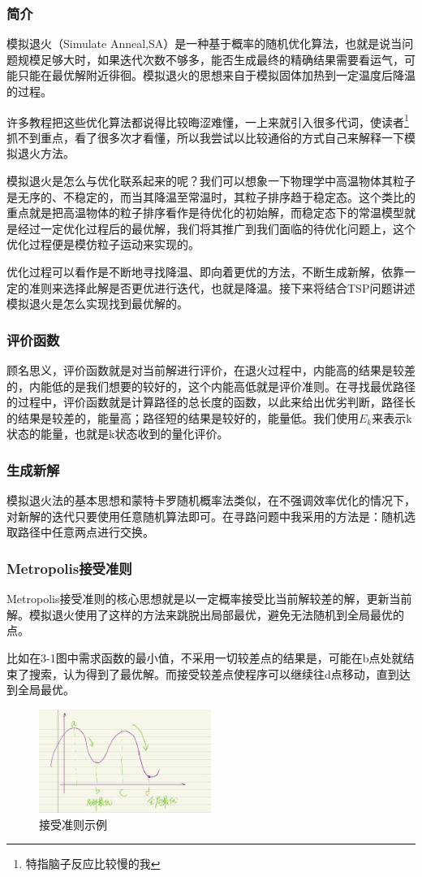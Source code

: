 \documentclass[12pt]{article}
\begin{document}
\subsubsection{简介}
模拟退火（Simulate Anneal,SA）是一种基于概率的随机优化算法，也就是说当问题规模足够大时，如果迭代次数不够多，能否生成最终的精确结果需要看运气，可能只能在最优解附近徘徊。模拟退火的思想来自于模拟固体加热到一定温度后降温的过程。

许多教程把这些优化算法都说得比较晦涩难懂，一上来就引入很多代词，使读者\footnote{特指脑子反应比较慢的我}抓不到重点，看了很多次才看懂，所以我尝试以比较通俗的方式自己来解释一下模拟退火方法。

模拟退火是怎么与优化联系起来的呢？我们可以想象一下物理学中高温物体其粒子是无序的、不稳定的，而当其降温至常温时，其粒子排序趋于稳定态。这个类比的重点就是把高温物体的粒子排序看作是待优化的初始解，而稳定态下的常温模型就是经过一定优化过程后的最优解，我们将其推广到我们面临的待优化问题上，这个优化过程便是模仿粒子运动来实现的。

优化过程可以看作是不断地寻找降温、即向着更优的方法，不断生成新解，依靠一定的准则来选择此解是否更优进行迭代，也就是降温。接下来将结合TSP问题讲述模拟退火是怎么实现找到最优解的。
\subsubsection{评价函数}
顾名思义，评价函数就是对当前解进行评价，在退火过程中，内能高的结果是较差的，内能低的是我们想要的较好的，这个内能高低就是评价准则。在寻找最优路径的过程中，评价函数就是计算路径的总长度的函数，以此来给出优劣判断，路径长的结果是较差的，能量高；路径短的结果是较好的，能量低。我们使用$E_{k}$来表示k状态的能量，也就是k状态收到的量化评价。
\subsubsection{生成新解}
模拟退火法的基本思想和蒙特卡罗随机概率法类似，在不强调效率优化的情况下，对新解的迭代只要使用任意随机算法即可。在寻路问题中我采用的方法是：随机选取路径中任意两点进行交换。
\subsubsection{Metropolis接受准则}
Metropolis接受准则的核心思想就是以一定概率接受比当前解较差的解，更新当前解。模拟退火使用了这样的方法来跳脱出局部最优，避免无法随机到全局最优的点。

\setcounter{figure}{0}
比如在3-1图中需求函数的最小值，不采用一切较差点的结果是，可能在b点处就结束了搜索，认为得到了最优解。而接受较差点使程序可以继续往d点移动，直到达到全局最优。
\begin{figure}[h]
    \centering
    \includegraphics[width = 0.5\textwidth]{assets/Metropolis-examp.jpg}
    \caption{\label{fig Metropolis-examp.jpg}接受准则示例}
\end{figure}
\end{document}
